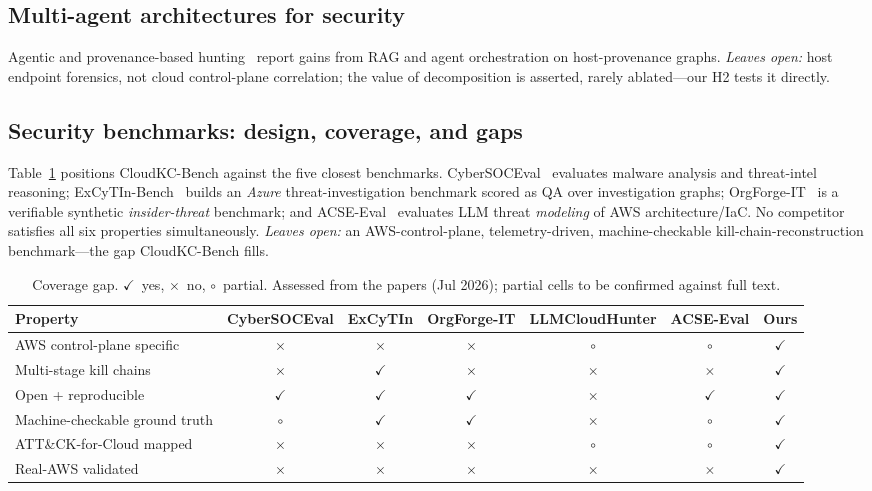 \documentclass[journal]{IEEEtran}
\newcommand{\cmark}{\ensuremath{\checkmark}}
\newcommand{\xmark}{\ensuremath{\times}}
\begin{document}
\subsection{Multi-agent architectures for security}
Agentic and provenance-based hunting~\cite{mukherjee2025provenance} report gains from
RAG and agent orchestration on host-provenance graphs.
\emph{Leaves open:} host endpoint forensics, not cloud control-plane correlation; the
value of decomposition is asserted, rarely ablated---our H2 tests it directly.

\subsection{Security benchmarks: design, coverage, and gaps}
Table~\ref{tab:coverage} positions CloudKC-Bench against the five closest benchmarks.
CyberSOCEval~\cite{deason2025cybersoceval} evaluates malware analysis and threat-intel
reasoning; ExCyTIn-Bench~\cite{wu2025excytin} builds an \emph{Azure} threat-investigation
benchmark scored as QA over investigation graphs; OrgForge-IT~\cite{orgforge2026} is a
verifiable synthetic \emph{insider-threat} benchmark; and ACSE-Eval~\cite{acseeval2025}
evaluates LLM threat \emph{modeling} of AWS architecture/IaC. No competitor satisfies all
six properties simultaneously.
\emph{Leaves open:} an AWS-control-plane, telemetry-driven, machine-checkable
kill-chain-reconstruction benchmark---the gap CloudKC-Bench fills.

\begin{table}[t]
\caption{Coverage gap. \cmark~yes, \xmark~no, $\circ$~partial. Assessed from the
papers (Jul 2026); partial cells to be confirmed against full text.}
\label{tab:coverage}
\centering
\begin{tabular}{lcccccc}
\toprule
Property & CyberSOCEval & ExCyTIn & OrgForge-IT & LLMCloudHunter & ACSE-Eval & \textbf{Ours} \\
\midrule
AWS control-plane specific      & \xmark & \xmark & \xmark & $\circ$ & $\circ$ & \cmark \\
Multi-stage kill chains         & \xmark & \cmark & \xmark & \xmark  & \xmark  & \cmark \\
Open + reproducible             & \cmark & \cmark & \cmark & \xmark  & \cmark  & \cmark \\
Machine-checkable ground truth  & $\circ$ & \cmark & \cmark & \xmark & $\circ$ & \cmark \\
ATT\&CK-for-Cloud mapped        & \xmark & \xmark & \xmark & $\circ$ & $\circ$ & \cmark \\
Real-AWS validated              & \xmark & \xmark & \xmark & \xmark  & \xmark  & \cmark \\
\bottomrule
\end{tabular}
\end{table}
\end{document}
